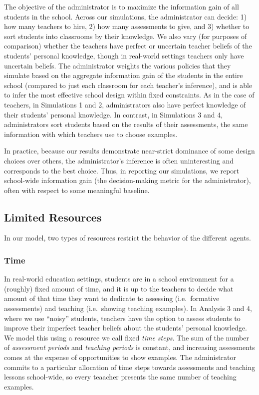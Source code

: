 \documentclass[10pt, letterpaper]{apa6}
\begin{document}
The objective of the administrator is to maximize the information gain
of all students in the school. Across our simulations, the administrator
can decide: 1) how many teachers to hire, 2) how many assessments to
give, and 3) whether to sort students into classrooms by their
knowledge. We also vary (for purposes of comparison) whether the
teachers have perfect or uncertain teacher beliefs of the students'
personal knowledge, though in real-world settings teachers only have
uncertain beliefs. The administrator weights the various policies that
they simulate based on the aggregate information gain of the students in
the entire school (compared to just each classroom for each teacher's
inference), and is able to infer the most effective school design within
fixed constraints. As in the case of teachers, in Simulations 1 and 2,
administrators also have perfect knowledge of their students' personal
knowledge. In contrast, in Simulations 3 and 4, administrators sort
students based on the results of their assessments, the same information
with which teachers use to choose examples.

In practice, because our results demonstrate near-strict dominance of
some design choices over others, the administrator's inference is often
uninteresting and corresponds to the best choice. Thus, in reporting our
simulations, we report school-wide information gain (the decision-making
metric for the administrator), often with respect to some meaningful
baseline.

\subsection{Limited Resources}\label{limited-resources}

In our model, two types of resources restrict the behavior of the
different agents.

\subsubsection{Time}\label{time}

In real-world education settings, students are in a school environment
for a (roughly) fixed amount of time, and it is up to the teachers to
decide what amount of that time they want to dedicate to assessing
(i.e.~formative assessments) and teaching (i.e.~showing teaching
examples). In Analysis 3 and 4, where we use ``noisy'' students,
teachers have the option to assess students to improve their imperfect
teacher beliefs about the students' personal knowledge. We model this
using a resource we call fixed \emph{time steps}. The sum of the number
of \emph{assessment periods} and \emph{teaching periods} is constant,
and increasing assessments comes at the expense of opportunities to show
examples. The administrator commits to a particular allocation of time
steps towards assessments and teaching lessons school-wide, so every
teaacher presents the same number of teaching examples.
\end{document}
